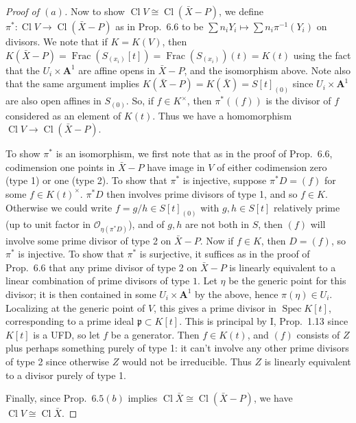 \documentclass[10pt]{article}
\theoremstyle{definition}
\theoremstyle{remark}
\numberwithin{equation}{section}
\numberwithin{figure}{subsubsection}
\DeclareMathOperator{\Spec}{Spec}
\DeclareMathOperator{\Frac}{Frac}
\DeclareMathOperator{\Cl}{Cl}
\newcommand{\OO}{\mathcal{O}}
\begin{document}
\begin{proof}[Proof of $(a)$]
  \par Now to show $\Cl V \cong \Cl(\bar{X} - P)$, we define $\pi^*\colon\Cl V \to \Cl(\bar{X} - P)$ as in Prop.~6.6 to be $\sum n_iY_i \mapsto \sum n_i\pi^{-1}(Y_i)$ on divisors. We note that if $K = K(V)$, then $K(\bar{X} - P) = \Frac(S_{(x_i)}[t]) = \Frac(S_{(x_i)})(t) = K(t)$ using the fact that the $U_i \times \mathbf{A}^1$ are affine opens in $\bar{X} - P$, and the isomorphism above. Note also that the same argument implies $K(\bar{X} - P) = K(\bar{X}) = S[t]_{(0)}$ since $U_i \times \mathbf{A}^1$ are also open affines in $S_{(0)}$. So, if $f \in K^\times$, then $\pi^*((f))$ is the divisor of $f$ considered as an element of $K(t)$. Thus we have a homomorphism $\Cl V \to \Cl(\bar{X} - P)$.
  \par To show $\pi^*$ is an isomorphism, we first note that as in the proof of Prop.~6.6, codimension one points in $\bar{X} - P$ have image in $V$ of either codimension zero (type 1) or one (type 2). To show that $\pi^*$ is injective, suppose $\pi^*D = (f)$ for some $f \in K(t)^\times$. $\pi^*D$ then involves prime divisors of type 1, and so $f \in K$. Otherwise we could write $f = g/h \in S[t]_{(0)}$ with $g,h \in S[t]$ relatively prime (up to unit factor in $\OO_{\eta(\pi^*D)}$), and of $g,h$ are not both in $S$, then $(f)$ will involve some prime divisor of type 2 on $\bar{X} - P$. Now if $f \in K$, then $D = (f)$, so $\pi^*$ is injective. To show that $\pi^*$ is surjective, it suffices as in the proof of Prop.~6.6 that any prime divisor of type 2 on $\bar{X} - P$ is linearly equivalent to a linear combination of prime divisors of type $1$. Let $\eta$ be the generic point for this divisor; it is then contained in some $U_i \times \mathbf{A}^1$ by the above, hence $\pi(\eta) \in U_i$. Localizing at the generic point of $V$, this gives a prime divisor in $\Spec K[t]$, corresponding to a prime ideal $\mathfrak{p} \subset K[t]$. This is principal by I, Prop.~1.13 since $K[t]$ is a UFD, so let $f$ be a generator. Then $f \in K(t)$, and $(f)$ consists of $Z$ plus perhaps something purely of type 1: it can't involve any other prime divisors of type 2 since otherwise $Z$ would not be irreducible. Thus $Z$ is linearly equivalent to a divisor purely of type 1.
  \par Finally, since Prop.~$6.5(b)$ implies $\Cl \bar{X} \cong \Cl(\bar{X} - P)$, we have $\Cl V \cong \Cl \bar{X}$.
\end{proof}
\end{document}
